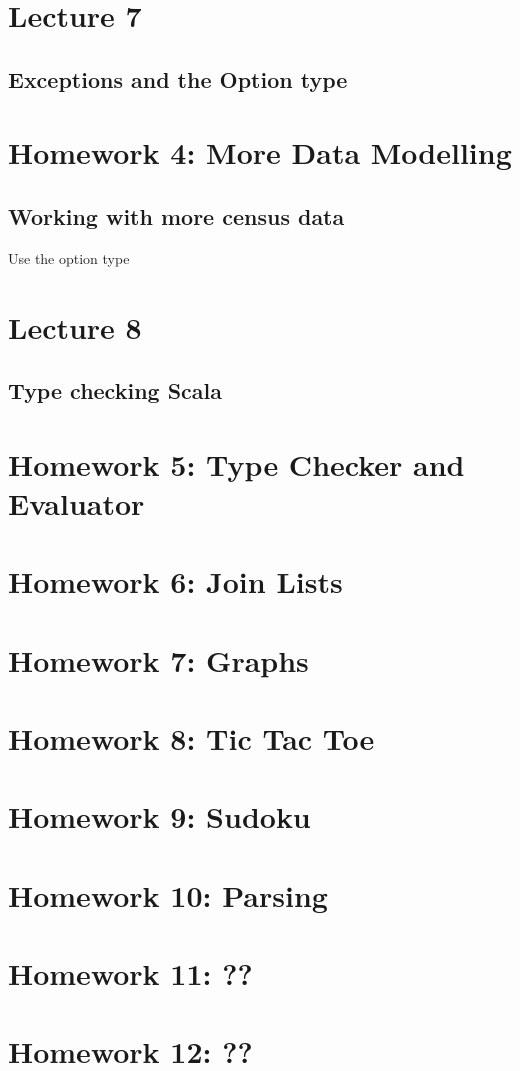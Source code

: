 \documentclass{book}
\begin{document}
\chapter{Lecture 7}

\section{Exceptions and the Option type}

\chapter{Homework 4: More Data Modelling}

\section{Working with more census data}

Use the option type

\chapter{Lecture 8}

\section{Type checking Scala}

\chapter{Homework 5: Type Checker and Evaluator}

\chapter{Homework 6: Join Lists}

\chapter{Homework  7: Graphs}

\chapter{Homework 8: Tic Tac Toe}

\chapter{Homework 9: Sudoku}

\chapter{Homework 10: Parsing}

\chapter{Homework 11: ??}

\chapter{Homework 12: ??}
\end{document}
